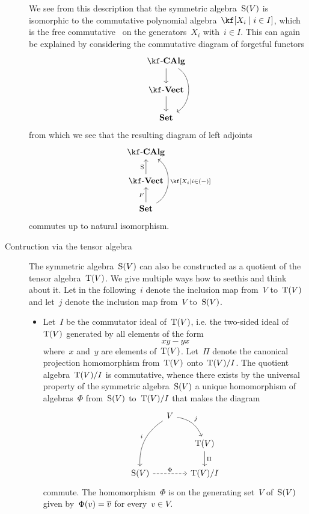 \begin{recall}
\begin{description}
			We see from this description that the symmetric algebra~$\operatorname{S}(V)$ is isomorphic to the commutative polynomial algebra~$\kf[X_i \suchthat i \in I]$, which is the free commutative~{\algebra{$\kf$}} on the generators~$X_i$ with~$i \in I$.
			This can again be explained by considering the commutative diagram of forgetful functors
			\[
				\begin{tikzcd}
					\cCAlg{\kf}
					\arrow{d}
					\arrow[bend left = 60]{dd}
					\\
					\cVect{\kf}
					\arrow{d}
					\\
					\cSet
				\end{tikzcd}
			\]
			from which we see that the resulting diagram of left adjoints
			\[
				\begin{tikzcd}
					\cCAlg{\kf}
					\\
					\cVect{\kf}
					\arrow{u}[left]{\Symm}
					&
					\\
					\cSet
					\arrow{u}[left]{F}
					\arrow[bend right = 60]{uu}[right]{\kf[X_i \suchthat i \in (-)]}
					&
					{}
				\end{tikzcd}
			\]
			commutes up to natural isomorphism.
			
		\item[Contruction via the tensor algebra]
			The symmetric algebra~$\operatorname{S}(V)$ can also be constructed as a quotient of the tensor algebra~$\operatorname{T}(V)$.
			We give multiple ways how to seethis and think about it.
			Let in the following~$i$ denote the inclusion map from~$V$ to~$\operatorname{T}(V)$ and let~$j$ denote the inclusion map from~$V$ to~$\operatorname{S}(V)$.
			\begin{itemize}
				\item
					Let~$I$ be the commutator ideal of~$\operatorname{T}(V)$, i.e. the two-sided ideal of~$\operatorname{T}(V)$ generated by all elements of the form
					\[
						x y - y x
					\]
					where~$x$ and~$y$ are elements of~$\operatorname{T}(V)$.
					Let~$\Pi$ denote the canonical projection homomorphism from~$\operatorname{T}(V)$ onto~$\operatorname{T}(V)/I$.
					The quotient algebra~$\operatorname{T}(V)/I$ is commutative, whence there exists by the universal property of the symmetric algebra~$\operatorname{S}(V)$ a unique homomorphism of algebras~$\Phi$ from~$\operatorname{S}(V)$ to~$\operatorname{T}(V)/I$ that makes the diagram
					\[
						\begin{tikzcd}[column sep = small]
							{}
							&
							V
							\arrow[bend right]{ddl}[above left]{i}
							\arrow[bend left]{dr}[above right]{j}
							&
							{}
							\\
							{}
							&
							{}
							&
							\Tensor(V)
							\arrow{d}[right]{\Pi}
							\\
							\Symm(V)
							\arrow[dashed]{rr}[above]{\Phi}
							&
							{}
							&
							\Tensor(V)/I
						\end{tikzcd}
					\]
					commute.
					The homomorphism~$\Phi$ is on the generating set~$V$ of~$\operatorname{S}(V)$ given by~$\Phi(v) = \overline{v}$ for every~$v \in V$.


\end{itemize}
\end{description}
\end{recall}
